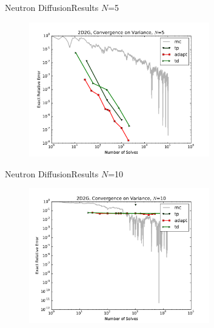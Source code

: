 \documentclass{beamer}
\begin{document}
\begin{frame}{Neutron Diffusion}{Results}%
  $N$=5
  \begin{figure}[h!]
    \centering
    \includegraphics[width=0.7\textwidth]{../../graphics/2D2G_varconv_5}
  \end{figure}
\end{frame}

\begin{frame}{Neutron Diffusion}{Results}%
  $N$=10
  \begin{figure}[h!]
    \centering
    \includegraphics[width=0.7\textwidth]{../../graphics/2D2G_varconv_10}
  \end{figure}
\end{frame}
\end{document}

